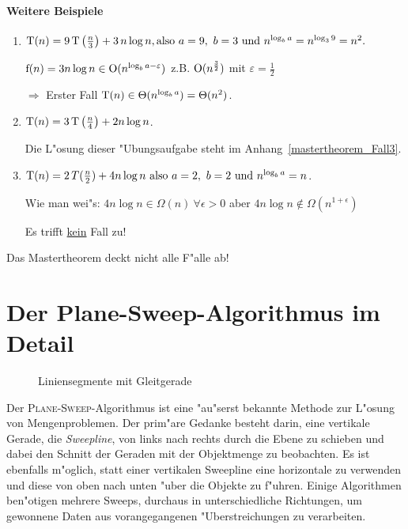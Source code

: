 \documentclass[draft,12pt]{scrreprt}
\theoremstyle{break}
\begin{document}
\subsubsection{Weitere Beispiele}
\begin{enumerate}
\item \( \textup{T}(n) = 9 \, \textup{T}\left(\frac{n}{3}\right) + 3 \, n\log n, \textup{also}\ a = 9,\ b = 3\ 
\textup{und}\ n^{\log_ba} = n^{\log_39} = n^2.\)

\(\textup{f}(n) = 3n\log n \in \textup{O}(n^{\log_ba-\varepsilon}) \)
z.B. \(\textup{O}(n^{\frac{3}{2}})\) mit \( \varepsilon = \frac{1}{2} \)

\( \Rightarrow \) Erster Fall \( \textup{T}(n) \in \Theta(n^{\log_ba}) = \Theta (n^2) \).

\item \( \textup{T}(n) = 3 \, \textup{T}\left(\frac{n}{4}\right) + 2n\log n\).

Die L"osung dieser "Ubungsaufgabe steht im Anhang~\ref{mastertheorem_Fall3}.

\item \( \textup{T}(n) = 2 \, T(\frac{n}{2}) + 4n\log n\ \textup{also}\
a = 2,\ b = 2\ \textup{und}\ n^{\log_ba} = n \).

Wie man wei"s: \(4n\log n \in \Omega(n)\ \forall \epsilon >0\) aber \(4n\log n \notin \Omega(n^{1+\epsilon})\)
	
Es trifft \underline{kein} Fall zu!
\end{enumerate}
Das Mastertheorem deckt nicht alle F"alle ab!

	
\appendix    %

\chapter{Der Plane-Sweep-Algorithmus im Detail}
\label{planesweep}

\begin{figure}
  \begin{center}  \end{center}
  \caption{Liniensegmente mit Gleitgerade}
  \label{131003d}
\end{figure}

Der \textsc{Plane-Sweep}-Algorithmus ist eine "au"serst bekannte
Methode zur L"osung von Mengenproblemen. Der prim"are Gedanke
besteht darin, eine vertikale Gerade, die \textit{Sweep\-line}, von
links nach rechts durch die Ebene zu schieben und dabei den
Schnitt der Geraden mit der Objektmenge zu beobachten. Es
ist ebenfalls m"oglich, statt einer vertikalen Sweepline eine
horizontale zu verwenden und diese von oben nach unten "uber die
Objekte zu f"uhren. Einige Algorithmen ben"otigen mehrere Sweeps,
durchaus in unterschiedliche Richtungen, um gewonnene Daten aus
vorangegangenen "Uberstreichungen zu verarbeiten.
\end{document}
